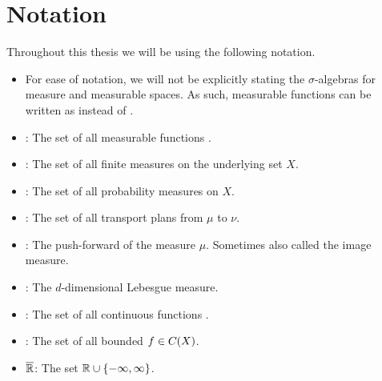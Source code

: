 \chapter*{Notation}

Throughout this thesis we will be using the following notation.

\begin{itemize}
	\item For ease of notation, we will not be explicitly stating the $\sigma$-algebras for measure and measurable spaces. As such, measurable functions can be written as  instead of .
	\item {}: The set of all measurable functions .
	\item {}: The set of all finite measures on the underlying set $X$.
	\item {}: The set of all probability measures on $X$.
	\item \TP{\mu}{\nu}: The set of all transport plans from $\mu$ to $\nu$.
	\item \push{\mu}: The push-forward of the measure $\mu$. Sometimes also called the image measure.
	\item \leb[d]{\cdot}: The $d$-dimensional Lebesgue measure.
	\item {}: The set of all continuous functions .
	\item {}: The set of all bounded $f \in C_{}(X)$.
	\item $\overline{\mathbb{R}}$: The set $\mathbb{R} \cup \{ -\infty, \infty \}$.
\end{itemize}
